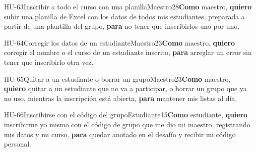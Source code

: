 \begin{historia}[1]{HU-63}{Inscribir a todo el curso con una planilla}{Maestro}{2}{8}{\textbf{Como} maestro, \textbf{quiero} subir una planilla de Excel con los datos de todos mis estudiantes, preparada a partir de una plantilla del grupo, \textbf{para} no tener que inscribirlos uno por uno.}
\end{historia}

\begin{historia}[1]{HU-64}{Corregir los datos de un estudiante}{Maestro}{2}{3}{\textbf{Como} maestro, \textbf{quiero} corregir el nombre o el curso de un estudiante inscrito, \textbf{para} arreglar un error sin tener que inscribirlo otra vez.}
\end{historia}

\begin{historia}[1]{HU-65}{Quitar a un estudiante o borrar un grupo}{Maestro}{2}{3}{\textbf{Como} maestro, \textbf{quiero} quitar a un estudiante que no va a participar, o borrar un grupo que ya no uso, mientras la inscripción está abierta, \textbf{para} mantener mis listas al día.}
\end{historia}

\begin{historia}[1]{HU-66}{Inscribirse con el código del grupo}{Estudiante}{1}{5}{\textbf{Como} estudiante, \textbf{quiero} inscribirme yo mismo con el código de grupo que me dio mi maestro, registrando mis datos y mi curso, \textbf{para} quedar anotado en el desafío y recibir mi código personal.}
\end{historia}

